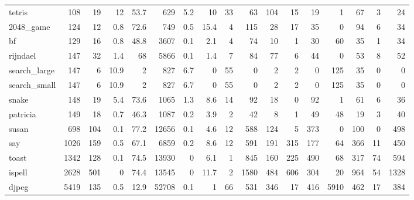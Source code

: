 \begin{tabular}{lrrrrrrrrrrrrrrrr}
 tetris          &      108 &   19 &   12   &     53.7 &     629 &    5.2 &     10   &    33 &      63 &  104 &    15 &    19 &     1 &    67 &      3 &        24 \\
 2048\_game       &      124 &   12 &    0.8 &     72.6 &     749 &    0.5 &     15.4 &     4 &     115 &   28 &    17 &    35 &     0 &    94 &      6 &        34 \\
 bf              &      129 &   16 &    0.8 &     48.8 &    3607 &    0.1 &      2.1 &     4 &      74 &   10 &     1 &    30 &    60 &    35 &      1 &        34 \\
 rijndael        &      147 &   32 &    1.4 &     68   &    5866 &    0.1 &      1.4 &     7 &      84 &   77 &     6 &    44 &     0 &    53 &      8 &        52 \\
 search\_large    &      147 &    6 &   10.9 &      2   &     827 &    6.7 &      0   &    55 &       0 &    2 &     2 &     0 &   125 &    35 &      0 &         0 \\
 search\_small    &      147 &    6 &   10.9 &      2   &     827 &    6.7 &      0   &    55 &       0 &    2 &     2 &     0 &   125 &    35 &      0 &         0 \\
 snake           &      148 &   19 &    5.4 &     73.6 &    1065 &    1.3 &      8.6 &    14 &      92 &   18 &     0 &    92 &     1 &    61 &      6 &        36 \\
 patricia        &      149 &   18 &    0.7 &     46.3 &    1087 &    0.2 &      3.9 &     2 &      42 &    8 &     1 &    49 &    48 &    19 &      3 &        40 \\
 susan           &      698 &  104 &    0.1 &     77.2 &   12656 &    0.1 &      4.6 &    12 &     588 &  124 &     5 &   373 &     0 &   100 &      0 &       498 \\
 say             &     1026 &  159 &    0.5 &     67.1 &    6859 &    0.2 &      8.6 &    12 &     591 &  191 &   315 &   177 &    64 &   366 &     11 &       450 \\
 toast           &     1342 &  128 &    0.1 &     74.5 &   13930 &    0   &      6.1 &     1 &     845 &  160 &   225 &   490 &    68 &   317 &     74 &       594 \\
 ispell          &     2628 &  501 &    0   &     74.4 &   13545 &    0   &     11.7 &     2 &    1580 &  484 &   606 &   304 &    20 &   964 &     54 &      1328 \\
 djpeg           &     5419 &  135 &    0.5 &     12.9 &   52708 &    0.1 &      1   &    66 &     531 &  346 &    17 &   416 &  5910 &   462 &     17 &       384 \\

\end{tabular}
